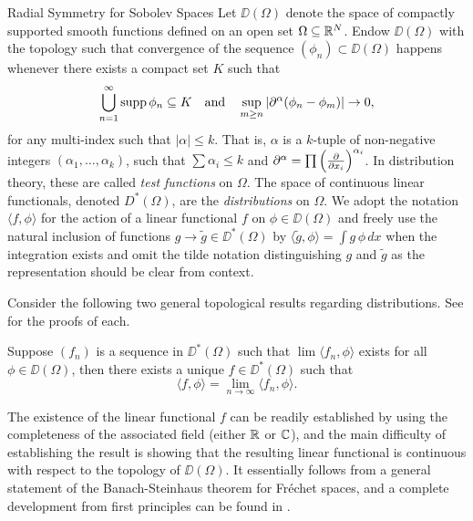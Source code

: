 \begin{chapter}{Radial Symmetry for Sobolev Spaces}
Let $\DD(\Omega)$ denote the space of compactly supported smooth functions defined on an open set $\Omega \subseteq \mathbb R^N$.
Endow $\DD(\Omega)$ with the topology such that convergence of the sequence $(\phi_n)\subset \DD(\Omega)$ happens whenever there exists a compact set $K$ such that 
\begin{equation}
  \bigcup_{n=1}^\infty \operatorname*{supp} \phi_n \subseteq K \quad\text{and}\quad
  \sup_{m\ge n} \left|\partial^\alpha (\phi_n-\phi_m)\right|\to 0, \label{eq:testFunctionContinuity}
\end{equation} 
for any multi-index such that $|\alpha|\le k$.
That is,  $\alpha$ is a $k$-tuple of non-negative integers $(\alpha_1,\dots, \alpha_k)$, such that $\sum \alpha_i \le k$ and $\partial^\alpha = \prod \left(\frac{\partial}{\partial x_i}\right)^{\alpha_i}$.
In distribution theory, these are called \emph{test functions} on $\Omega$.
The space of continuous linear functionals, denoted $D^*(\Omega)$, are the \emph{distributions} on $\Omega$.
We adopt the notation $\langle f, \phi\rangle$ for the action of a linear functional $f$ on $\phi \in \DD(\Omega)$ and freely use the natural inclusion of functions $g \to \tilde g \in \DD^*(\Omega)$ by $\langle \tilde g, \phi \rangle = \int g\, \phi\,dx$ when the integration exists and omit the tilde notation distinguishing $g$ and $\tilde g$ as the representation should be clear from context. 

Consider the following two general topological results regarding distributions. 
See \citep[Chapter 2]{hormander1983} for the proofs of each.
\begin{thm} \label{thm:completeness}
  Suppose $(f_n)$ is a sequence in $\DD^*(\Omega)$ such that $\lim\langle f_n,\phi\rangle$ exists for all $\phi \in \DD(\Omega)$, then there exists a unique $f\in \DD^*(\Omega)$ such that
  \begin{equation}
    \langle f, \phi\rangle = \lim_{n\to\infty} \langle f_n, \phi \rangle.
  \end{equation}
\end{thm}
The existence of the linear functional $f$ can be readily established by using the completeness of the associated field (either $\mathbb R$ or $\mathbb C$), and the main difficulty of establishing the result is showing that the resulting linear functional is continuous with respect to the topology of $\DD(\Omega)$.
It essentially follows from a general statement of the Banach-Steinhaus theorem for Fr\'{e}chet spaces, and a complete development from first principles can be found in \citep{rudin1991}.


\end{chapter}
